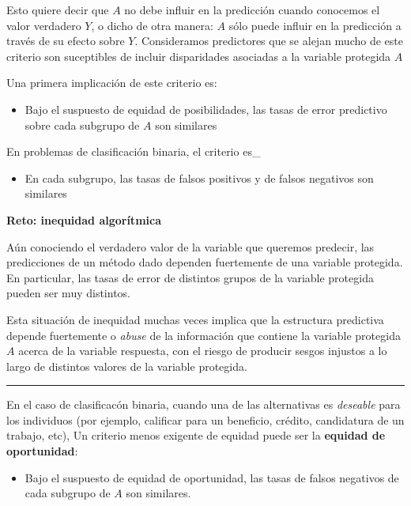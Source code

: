 \documentclass[
]{book}
\providecommand{\tightlist}{%
  \setlength{\itemsep}{0pt}\setlength{\parskip}{0pt}}
\let\BeginKnitrBlock\begin \let\EndKnitrBlock\end
\begin{document}
Esto quiere decir que \(A\) no debe influir en la predicción cuando conocemos el valor verdadero \(Y\), o dicho de otra
manera: \(A\) sólo puede influir en la predicción a través de su efecto sobre \(Y\). Consideramos predictores
que se alejan mucho de este criterio son suceptibles de incluir disparidades asociadas a la variable protegida \(A\)

Una primera implicación de este criterio es:

\begin{itemize}
\tightlist
\item
  Bajo el suspuesto de equidad de posibilidades, las tasas de error predictivo sobre cada subgrupo de \(A\) son similares
\end{itemize}

En problemas de clasificación binaria, el criterio es\_

\begin{itemize}
\tightlist
\item
  En cada subgrupo, las tasas de falsos positivos y de falsos negativos son similares
\end{itemize}

\BeginKnitrBlock{rmdnote}
\textbf{Reto: inequidad algorítmica}

Aún conociendo el verdadero valor de la variable que queremos predecir, las predicciones de un método dado dependen
fuertemente de una variable protegida. En particular, las tasas de error de distintos grupos de la variable protegida
pueden ser muy distintos.
\EndKnitrBlock{rmdnote}

Esta situación de inequidad muchas veces implica que la estructura predictiva depende fuertemente o \emph{abuse} \citep{hardt}
de la información
que contiene la variable protegida \(A\) acerca de la variable respuesta, con el riesgo de producir sesgos injustos a lo largo
de distintos valores de la variable protegida.

\begin{center}\rule{0.5\linewidth}{0.5pt}\end{center}

En el caso de clasificacón binaria, cuando una de las alternativas es \emph{deseable} para los individuos
(por ejemplo, calificar para un beneficio, crédito, candidatura de un trabajo, etc),
Un criterio menos exigente de equidad puede ser la \textbf{equidad de oportunidad}:

\begin{itemize}
\tightlist
\item
  Bajo el suspuesto de equidad de oportunidad, las tasas de falsos negativos de cada subgrupo de \(A\) son similares.
\end{itemize}
\end{document}

